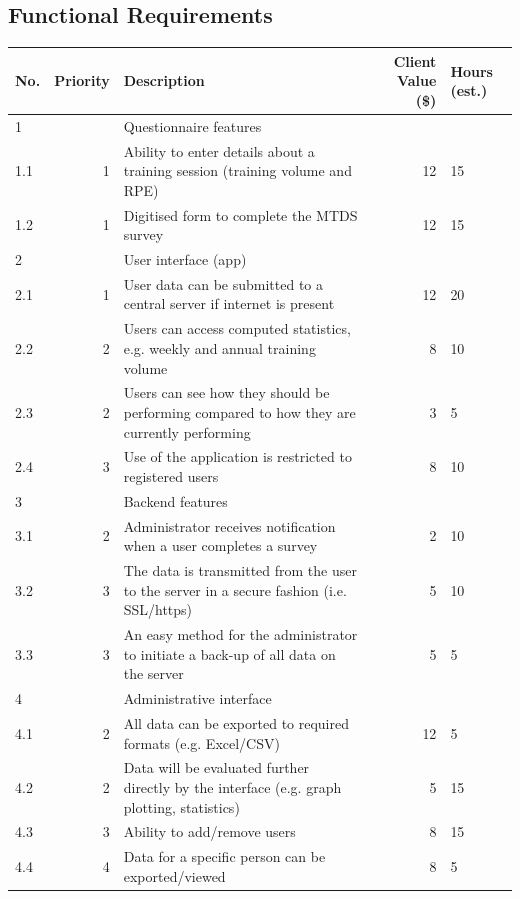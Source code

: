 \documentclass[a4paper, 11pt, titlepage]{article}
\begin{document}
\subsection{Functional Requirements}
\begin{table}[H]
  \centering
    \begin{tabularx}{\textwidth}{lrXrp{1cm}}
    \hline
    No.   & Priority & Description & Client Value (\$) & Hours (est.) \\
    \hline
    1     &       & Questionnaire features &       &        \\
    \hline
    1.1   & 1     & Ability to enter details about a training session (training volume and RPE) &  12     & 15 \\
    1.2   & 1     & Digitised form to complete the MTDS survey &     12  & 15 \\
    \hline
    2     &       & User interface (app) &       &        \\
    \hline
    2.1   & 1     & User data can be submitted to a central server if internet is present &   12    & 20 \\
    2.2   & 2     & Users can access computed statistics, e.g. weekly and annual training volume &   8    & 10 \\
    2.3   & 2     & Users can see how they should be performing compared to how they are currently performing &   3    & 5 \\
    2.4   & 3     & Use of the application is restricted to registered users &    8   & 10 \\
    \hline
    3     &       & Backend features &       &        \\
    \hline
    3.1   & 2     & Administrator receives notification when a user completes a survey &   2    & 10 \\
    3.2   & 3     & The data is transmitted from the user to the server in a secure fashion (i.e. SSL/https) &    5   & 10 \\
    3.3   & 3     & An easy method for the administrator to initiate a back-up of all data on the server &    5   & 5 \\
    \hline
    4     &       & Administrative interface &       &       \\
    \hline
    4.1   & 2     & All data can be exported to required formats (e.g. Excel/CSV) &    12   & 5 \\
    4.2   & 2     & Data will be evaluated further directly by the interface (e.g. graph plotting, statistics)  &   5    & 15 \\
    4.3   & 3     & Ability to add/remove users &   8    & 15 \\
    4.4   & 4     & Data for a specific person can be exported/viewed &   8    & 5 \\
    \hline
    \end{tabularx}%
  \label{tab:functional-requirements}%
\end{table}%
\end{document}
